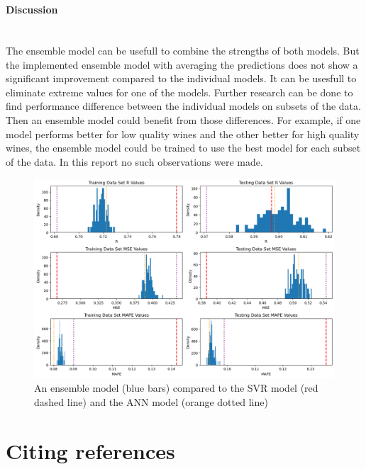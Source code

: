 \documentclass{article}
\newcommand{\subsubsubsection}[1]{%
  \paragraph{#1}\mbox{}\\}
\begin{document}
\subsubsubsection{Discussion}
The ensemble model can be usefull to combine the strengths of both models.
But the implemented ensemble model with averaging the predictions does not show a significant improvement compared to the individual models.
It can be usesfull to eliminate extreme values for one of the models.
Further research can be done to find performance difference between the individual models on subsets of the data.
Then an ensemble model could benefit from those differences.
For example, if one model performs better for low quality wines and the other better for high quality wines, the ensemble model could be trained to use the best model for each subset of the data.
In this report no such observations were made.

\begin{figure}
	\centering
	\includegraphics[width=\linewidth]{figures/ensemble_model_results.png}
	\caption{An ensemble model (blue bars) compared to the SVR model (red dashed line) and the ANN model (orange dotted line)}
	\label{fig:ensemble-model}
\end{figure}

\section{Citing references}


\end{document}
